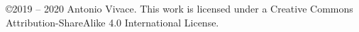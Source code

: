\documentclass[a4, oneside, 10pt]{memoir}
\begin{document}





\tableofcontents
\thispagestyle{empty}






\pagebreak
\thispagestyle{empty}
\noindent
\copyright 2019 -- 2020 Antonio Vivace. This work is licensed under a Creative Commons Attribution-ShareAlike 4.0 International License.
\end{document}
